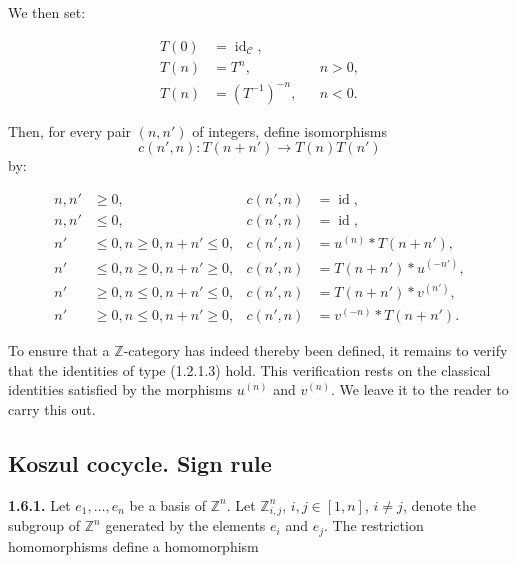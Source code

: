 %
We then set:

\begin{equation}
  \begin{aligned}
    T(0)&=\operatorname{id}_{\mathcal C},\\
    T(n)&=T^n, && n>0,\\
    T(n)&=(T^{-1})^{-n}, && n<0.
  \end{aligned}
  \tag{1.5.14.3}
\end{equation}

Then, for every pair $(n,n')$ of integers, define isomorphisms
\[
  c(n',n)\colon T(n+n')\longrightarrow T(n)T(n')
\]
by:

\begin{equation}
  \begin{aligned}
    n,n'&\geq 0,
      &c(n',n)&=\operatorname{id},\\
    n,n'&\leq 0,
      &c(n',n)&=\operatorname{id},\\
    n'&\leq 0, n\geq 0, n+n'\leq 0,
      &c(n',n)&=u^{(n)}\mathbin{*}T(n+n'),\\
    n'&\leq 0, n\geq 0, n+n'\geq 0,
      &c(n',n)&=T(n+n')\mathbin{*}u^{(-n')},\\
    n'&\geq 0, n\leq 0, n+n'\leq 0,
      &c(n',n)&=T(n+n')\mathbin{*}v^{(n')},\\
    n'&\geq 0, n\leq 0, n+n'\geq 0,
      &c(n',n)&=v^{(-n)}\mathbin{*}T(n+n').
  \end{aligned}
  \tag{1.5.14.4}
\end{equation}

To ensure that a $\mathbb Z$-category has indeed thereby been defined,
it remains to verify that the identities of type (1.2.1.3) hold. This
verification rests on the classical identities satisfied by the
morphisms $u^{(n)}$ and $v^{(n)}$. We leave it to the reader to carry
this out.

\subsection{Koszul cocycle. Sign rule}

\noindent\textbf{1.6.1.}\quad
Let $e_1,\ldots,e_n$ be a basis of $\mathbb Z^n$. Let
$\mathbb Z^n_{i,j}$, $i,j\in[1,n]$, $i\neq j$, denote the subgroup of
$\mathbb Z^n$ generated by the elements $e_i$ and $e_j$. The
restriction homomorphisms define a homomorphism

